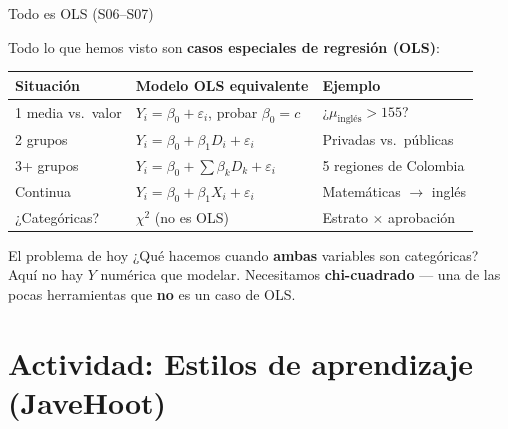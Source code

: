\documentclass[aspectratio=169, 11pt]{beamer}
\begin{document}
\begin{frame}{Todo es OLS (S06--S07)}
\small

Todo lo que hemos visto son \textbf{casos especiales de regresión (OLS)}:

\vspace{0.2cm}
\begin{center}
\footnotesize
\begin{tabular}{p{3.2cm}p{4.2cm}p{3.5cm}}
\toprule
\textbf{Situación} & \textbf{Modelo OLS equivalente} & \textbf{Ejemplo} \\
\midrule
1 media vs.\ valor & $Y_i = \beta_0 + \varepsilon_i$, probar $\beta_0 = c$ & ¿$\mu_{\text{inglés}} > 155$? \\[0.08cm]
2 grupos & $Y_i = \beta_0 + \beta_1 D_i + \varepsilon_i$ & Privadas vs.\ públicas \\[0.08cm]
3+ grupos & $Y_i = \beta_0 + \sum \beta_k D_k + \varepsilon_i$ & 5 regiones de Colombia \\[0.08cm]
Continua & $Y_i = \beta_0 + \beta_1 X_i + \varepsilon_i$ & Matemáticas $\to$ inglés \\[0.08cm]
\alert{¿Categóricas?} & \alert{$\chi^2$ (no es OLS)} & \alert{Estrato $\times$ aprobación} \\
\bottomrule
\end{tabular}
\end{center}

\vspace{0.2cm}
\begin{alertblock}{El problema de hoy}
¿Qué hacemos cuando \textbf{ambas} variables son \alert{categóricas}? Aquí no hay $Y$ numérica que modelar. Necesitamos \textbf{chi-cuadrado} --- una de las pocas herramientas que \textbf{no} es un caso de OLS.
\end{alertblock}
\end{frame}

\section{Actividad: Estilos de aprendizaje (JaveHoot)}
\end{document}
